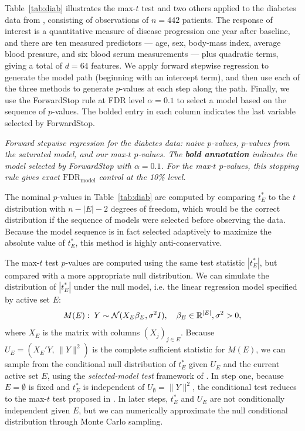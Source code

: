 \documentclass{article}
\begin{document}
Table~\ref{tab:diab} illustrates the max-$t$ test and two others applied to the diabetes data from \cite{LARS}, consisting of observations of $n=442$ patients. The response of interest is a quantitative measure of disease progression one year after baseline, and there are ten measured predictors --- age, sex, body-mass index, average blood pressure, and six blood serum measurements --- plus quadratic terms, giving a total of $d=64$ features. We apply forward stepwise regression to generate the model path (beginning with an intercept term), and then use each of the three methods to generate $p$-values at each step along the path. Finally, we use the ForwardStop rule \citep{gsell2013sequential} at FDR level $\alpha=0.1$ to select a model based on the sequence of $p$-values. The bolded entry in each column indicates the last variable selected by ForwardStop.

\begin{table}[ht]
\centering

\caption[tab:diab]{\em Forward stepwise regression for the diabetes data: naive $p$-values, $p$-values from the saturated model, and our max-$t$ $p$-values. The {\bf bold annotation} indicates the model selected by ForwardStop with $\alpha=0.1$. For the max-$t$ $p$-values, this stopping rule gives exact $\text{FDR}_{\text{model}}$ control at the 10\% level.}
\label{tab:diab}
\end{table}

The nominal $p$-values in Table~\ref{tab:diab} are computed by comparing $t_E^*$ to the $t$ distribution with $n-|E|-2$ degrees of freedom, which would be the correct distribution if the sequence of models were selected before observing the data. Because the model sequence is in fact selected adaptively to maximize the absolute value of $t_E^*$, this method is highly anti-conservative.

The max-$t$ test $p$-values are computed using the same test statistic $|t_E^*|$, but compared with a more appropriate null distribution. We can simulate the distribution of $|t_E^*|$ under the null model, i.e. the linear regression model specified by active set $E$:
\begin{equation}
  M(E):\; Y \sim \mathcal{N}(X_E\beta_E, \sigma^2 I), \quad \beta_E\in \mathbb{R}^{|E|}, \sigma^2>0,
\end{equation}
where $X_E$ is the matrix with columns $(X_j)_{j\in E}$. Because $U_E=\left(X_E'Y,\, \|Y\|^2\right)$ is the complete sufficient statistic for $M(E)$, we can sample from the conditional null distribution of $t_E^*$ given $U_E$ and the current active set $E$, using the {\em selected-model test} framework of \citet{fithian2014optimal}. In step one, because $E=\emptyset$ is fixed and $t_E^*$ is independent of $U_\emptyset=\|Y\|^2$, the conditional test reduces to the max-$t$ test proposed in \citet{buja2014}. In later steps, $t_E^*$ and $U_E$ are not conditionally independent given $E$, but we can numerically approximate the null conditional distribution through Monte Carlo sampling.
\end{document}
